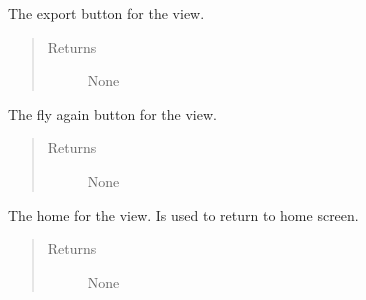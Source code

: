 \documentclass[letterpaper,10pt,english]{sphinxmanual}
\begin{document}
\begin{fulllineitems}
\begin{quote}
\begin{description}
\begin{itemize}
\end{itemize}

\end{description}\end{quote}

\begin{fulllineitems}
\label{\detokenize{index:src.Views.View_ReportScreen.ReportWindow.BtnExport}}
The export button for the view.
\begin{quote}\begin{description}
\item[{Returns}] \leavevmode
None

\end{description}\end{quote}

\end{fulllineitems}


\begin{fulllineitems}
\label{\detokenize{index:src.Views.View_ReportScreen.ReportWindow.BtnFlyAgain}}
The fly again button for the view.
\begin{quote}\begin{description}
\item[{Returns}] \leavevmode
None

\end{description}\end{quote}

\end{fulllineitems}


\begin{fulllineitems}
\label{\detokenize{index:src.Views.View_ReportScreen.ReportWindow.BtnHome}}
The home for the view. Is used to return to home screen.
\begin{quote}\begin{description}
\item[{Returns}] \leavevmode
None


\end{description}
\end{quote}
\end{fulllineitems}
\end{fulllineitems}
\end{document}
